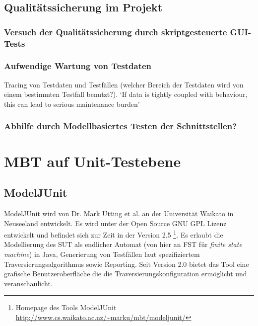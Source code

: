 \subsection{Qualitätssicherung im Projekt}
\subsubsection{Versuch der Qualitätssicherung durch skriptgesteuerte GUI-Tests}
\subsubsection{Aufwendige Wartung von Testdaten}
Tracing von Testdaten und Testfällen (welcher Bereich der Testdaten wird von einem bestimmten Testfall benutzt?). `If data is tightly coupled with behaviour, this can lead to serious maintenance burden' \cite{baker_model-driven_2005} 
\subsubsection{Abhilfe durch Modellbasiertes Testen der Schnittstellen?}


\section{MBT auf Unit-Testebene}
\subsection{ModelJUnit}
ModelJUnit wird von Dr. Mark Utting et al. an der Universität Waikato in Neuseeland entwickelt. Es wird unter der Open Source GNU GPL Lizenz entwickelt und befindet sich zur Zeit in der Version 2.5 \footnote{Homepage des Tools ModelJUnit \url{http://www.cs.waikato.ac.nz/~marku/mbt/modeljunit/}}. Es erlaubt die Modellierung des SUT als endlicher Automat (von hier an FST für \textit{finite state machine}) in Java, Generierung von Testfällen laut spezifiziertem Traversierungsalgorithmus sowie Reporting. Seit Version 2.0 bietet das Tool eine grafische Benutzeroberfläche die die Traversierungskonfiguration ermöglicht und veranschaulicht.\\

